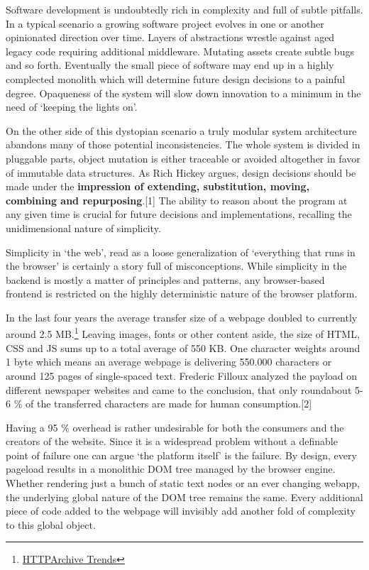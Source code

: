 \documentclass[]{article}
\begin{document}
Software development is undoubtedly rich in complexity and full of
subtle pitfalls. In a typical scenario a growing software project
evolves in one or another opinionated direction over time. Layers of
abstractions wrestle against aged legacy code requiring additional
middleware. Mutating assets create subtle bugs and so forth. Eventually
the small piece of software may end up in a highly complected monolith
which will determine future design decisions to a painful degree.
Opaqueness of the system will slow down innovation to a minimum in the
need of `keeping the lights on'.

On the other side of this dystopian scenario a truly modular system
architecture abandons many of those potential inconsistencies. The whole
system is divided in pluggable parts, object mutation is either
traceable or avoided altogether in favor of immutable data structures.
As Rich Hickey argues, design decisions should be made under the
\textbf{impression of extending, substitution, moving, combining and
repurposing}.{[}1{]} The ability to reason about the program at any
given time is crucial for future decisions and implementations,
recalling the unidimensional nature of simplicity.

Simplicity in `the web', read as a loose generalization of `everything
that runs in the browser' is certainly a story full of misconceptions.
While simplicity in the backend is mostly a matter of principles and
patterns, any browser-based frontend is restricted on the highly
deterministic nature of the browser platform.

In the last four years the average transfer size of a webpage doubled to
currently around 2.5 MB.\footnote{\href{http://httparchive.org/trends.php}{HTTPArchive
  Trends}} Leaving images, fonts or other content aside, the size of
HTML, CSS and JS sums up to a total average of 550 KB. One character
weights around 1 byte which means an average webpage is delivering
550.000 characters or around 125 pages of single-spaced text. Frederic
Filloux analyzed the payload on different newspaper websites and came to
the conclusion, that only roundabout 5-6 \% of the transferred
characters are made for human consumption.{[}2{]}

Having a 95 \% overhead is rather undesirable for both the consumers and
the creators of the website. Since it is a widespread problem without a
definable point of failure one can argue `the platform itself' is the
failure. By design, every pageload results in a monolithic DOM tree
managed by the browser engine. Whether rendering just a bunch of static
text nodes or an ever changing webapp, the underlying global nature of
the DOM tree remains the same. Every additional piece of code added to
the webpage will invisibly add another fold of complexity to this global
object.
\end{document}
